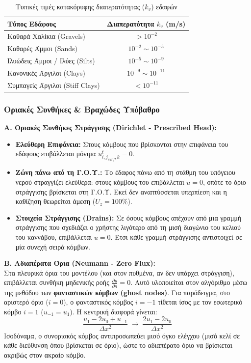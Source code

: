 \documentclass[11pt,a4paper]{article}
\begin{document}
\begin{table}[H]
  \centering
  \caption{Τυπικές τιμές κατακόρυφης διαπερατότητας ($k_v$) εδαφών}\label{tab:k}
  \begin{tabular}{lc}
    \toprule
    \textbf{Τύπος Εδάφους} & \textbf{Διαπερατότητα $k_v$ (m/s)} \\
    \midrule
    Καθαρά Χαλίκια (Gravels) & $> 10^{-2}$ \\
    Καθαρές Άμμοι (Sands) & $10^{-2} \sim 10^{-5}$ \\
    Ιλυώδεις Άμμοι / Ιλύες (Silts) & $10^{-5} \sim 10^{-9}$ \\
    Κανονικές Άργιλοι (Clays) & $10^{-9} \sim 10^{-11}$ \\
    Συμπαγείς Άργιλοι (Stiff Clays) & $< 10^{-11}$ \\
    \bottomrule
  \end{tabular}
\end{table}

\subsubsection{Οριακές Συνθήκες \& Βραχώδες Υπόβαθρο}\label{sec:bc}

\textbf{Α. Οριακές Συνθήκες Στράγγισης (Dirichlet - Prescribed Head):}
\begin{itemize}
  \item \textbf{Ελεύθερη Επιφάνεια:} Στους κόμβους που βρίσκονται στην επιφάνεια του εδάφους επιβάλλεται μόνιμα $u^{t}_{i,j_{surf},k} = 0$.
  \item \textbf{Ζώνη πάνω από τη Γ.Ο.Υ.:} Το έδαφος πάνω από τη στάθμη του υπόγειου νερού στραγγίζει ελεύθερα: στους κόμβους του επιβάλλεται $u = 0$, οπότε το όριο στράγγισης βρίσκεται στη Γ.Ο.Υ. Εκεί δεν αναπτύσσεται υπερπίεση και η καθίζηση θεωρείται άμεση ($U_z = 100\%$).
  \item \textbf{Στοιχεία Στράγγισης (Drains):} Σε όσους κόμβους απέχουν από μια γραμμή στράγγισης που σχεδιάζει ο χρήστης λιγότερο από τη μισή διαγώνιο του κελιού του καννάβου, επιβάλλεται $u = 0$. Έτσι κάθε γραμμή στράγγισης αντιστοιχεί σε μία συνεχή σειρά κόμβων.
\end{itemize}

\textbf{Β. Αδιαπέρατα Όρια (Neumann - Zero Flux):}\\
Στα πλευρικά όρια του μοντέλου (και στον πυθμένα, αν δεν υπάρχει στράγγιση), επιβάλλεται συνθήκη μηδενικής ροής $\frac{\partial u}{\partial n} = 0$. Αυτό υλοποιείται στον αλγόριθμο μέσω της μεθόδου των \textbf{φανταστικών κόμβων (ghost nodes)}. Για παράδειγμα, στο αριστερό όριο ($i = 0$), ο φανταστικός κόμβος $i = -1$ τίθεται ίσος με τον εσωτερικό κόμβο $i = 1$ ($u_{-1} = u_1$). Η κεντρική διαφορά γίνεται:
\begin{equation}
  \frac{u_1 - 2u_0 + u_{-1}}{\Delta x^2} \;\rightarrow\; \frac{2u_1 - 2u_0}{\Delta x^2}
\end{equation}
Ισοδύναμα, ο συνοριακός κόμβος αντιπροσωπεύει μισό όγκο ελέγχου (μισό κελί σε κάθε διεύθυνση όπου βρίσκεται σε όριο), ώστε το αδιαπέρατο όριο να βρίσκεται ακριβώς στον ακραίο κόμβο.
\end{document}
